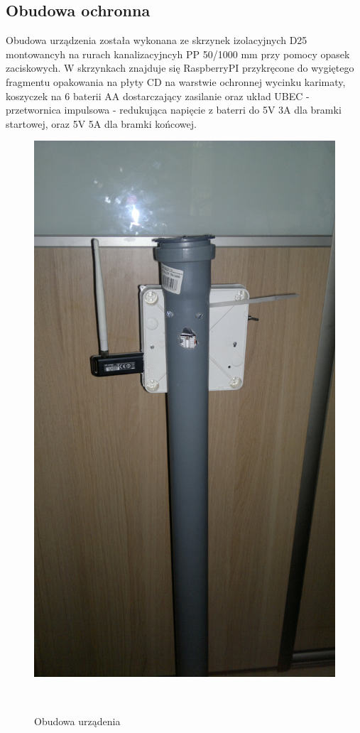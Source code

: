 \documentclass[11pt,a4paper, twoside]{article}
\begin{document}
\subsection{Obudowa ochronna}
Obudowa urządzenia została wykonana ze skrzynek izolacyjnych D25 montowancyh na rurach kanalizacyjncyh PP 50/1000 mm przy pomocy opasek zaciskowych. W skrzynkach znajduje się RaspberryPI przykręcone do wygiętego fragmentu opakowania na płyty CD na warstwie ochronnej wycinku karimaty, koszyczek na 6 baterii AA dostarczający zasilanie oraz układ UBEC - przetwornica impulsowa - redukująca napięcie z baterri do 5V 3A dla bramki startowej, oraz 5V 5A dla bramki końcowej. 

\begin{figure}[H]
\begin{center}
\includegraphics[scale=0.10]{./img/device.jpg}
\caption{Obudowa urządenia}
$\label{device}$
\end{center}
\end{figure}
\fi
\newpage
\end{document}
